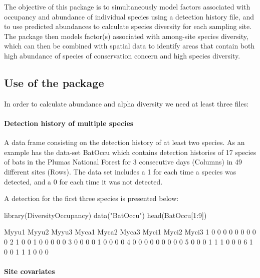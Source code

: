 \documentclass[article]{jss}
\begin{document}
The objective of this package is to simultaneously model factors
associated with occupancy and abundance of individual species using a
detection history file, and to use predicted abundances to calculate
species diversity for each sampling site. The package then models
factor(s) associated with among-site species diversity, which can then
be combined with spatial data to identify areas that contain both high
abundance of species of conservation concern and high species diversity.

\subsection{Use of the package}\label{use-of-the-package}

In order to calculate abundance and alpha diversity we need at least
three files:

\paragraph{Detection history of multiple
species}\label{detection-history-of-multiple-species}

A data frame consisting on the detection history of at least two
species. As an example  has the data-set BatOccu
which contains detection histories of 17 species of bats in the Plumas
National Forest for 3 consecutive days (Columns) in 49 different sites
(Rows). The data set includes a 1 for each time a species was detected,
and a 0 for each time it was not detected.

A detection for the first three species is presented below:

\begin{CodeChunk}
\begin{CodeInput}
library(DiversityOccupancy)
data("BatOccu")
head(BatOccu[1:9])
\end{CodeInput}
\begin{CodeOutput}
  Myyu1 Myyu2 Myyu3 Myca1 Myca2 Myca3 Myci1 Myci2 Myci3
1     0     0     0     0     0     0     0     0     0
2     1     0     0     1     0     0     0     0     0
3     0     0     0     0     1     0     0     0     0
4     0     0     0     0     0     0     0     0     0
5     0     0     0     1     1     1     0     0     0
6     1     0     0     1     1     1     0     0     0
\end{CodeOutput}
\end{CodeChunk}

\paragraph{Site covariates}\label{site-covariates}
\end{document}
